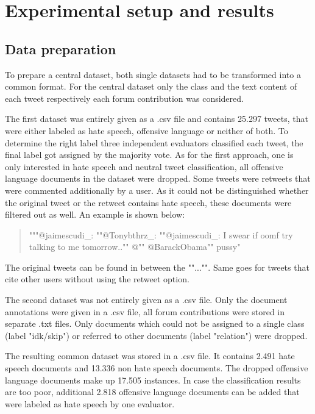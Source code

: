 \section{Experimental setup and results} \label{results}

\subsection{Data preparation}

To prepare a central dataset, both single datasets had to be transformed into a common format. For the central dataset only the class and the text content of each tweet respectively each forum contribution was considered.

The first dataset  was entirely given as a .csv file and contains 25.297 tweets, that were either labeled as hate speech, offensive language or neither of both. To determine the right label three independent evaluators classified each tweet, the final label got assigned by the majority vote. As for the first approach, one is only interested in hate speech and neutral tweet classification, all offensive language documents in the dataset were dropped. Some tweets were retweets that were commented additionally by a user. As it could not be distinguished whether the original tweet or the retweet contains hate speech, these documents were filtered out as well. An example is shown below:

\begin{quote}
    """@jaimescudi\_: ""@Tonybthrz\_: ""@jaimescudi\_: I swear if oomf try talking to me tomorrow.."" @"" @BarackObama"" pussy"
\end{quote}

The original tweets can be found in between the ""..."". Same goes for tweets that cite other users without using the retweet option.

\vspace{0.5cm}

The second dataset  was not entirely given as a .csv file. Only the document annotations were given in a .csv file, all forum contributions were stored in separate .txt files. Only documents which could not be assigned to a single class (label "idk/skip") or referred to other documents (label "relation") were dropped.

The resulting common dataset was stored in a .csv file. It contains 2.491 hate speech documents and 13.336 non hate speech documents. The dropped offensive language documents make up 17.505 instances. In case the classification results are too poor, additional 2.818 offensive language documents can be added that were labeled as hate speech by one evaluator.

